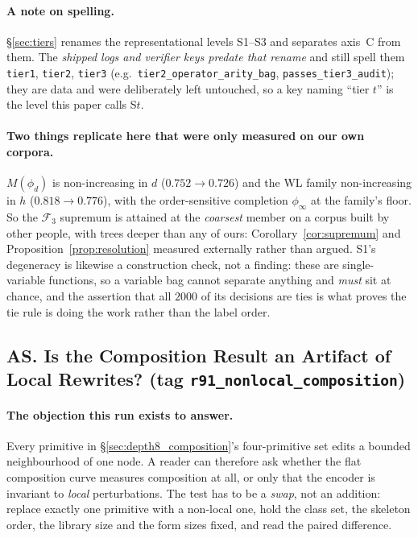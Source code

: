 \paragraph{A note on spelling.} \S\ref{sec:tiers} renames the representational levels S1--S3 and separates axis~C from them. The \emph{shipped logs and verifier keys predate that rename} and still spell them \texttt{tier1}, \texttt{tier2}, \texttt{tier3} (e.g.\ \texttt{tier2\_operator\_arity\_bag}, \texttt{passes\_tier3\_audit}); they are data and were deliberately left untouched, so a key naming ``tier $t$'' is the level this paper calls S$t$.

\paragraph{Two things replicate here that were only measured on our own corpora.} $M(\phi_d)$ is non-increasing in $d$ ($0.752 \to 0.726$) and the WL family non-increasing in $h$ ($0.818 \to 0.776$), with the order-sensitive completion $\phi_\infty$ at the family's floor. So the $\mathcal{F}_3$ supremum is attained at the \emph{coarsest} member on a corpus built by other people, with trees deeper than any of ours: Corollary~\ref{cor:supremum} and Proposition~\ref{prop:resolution} measured externally rather than argued. S1's degeneracy is likewise a construction check, not a finding: these are single-variable functions, so a variable bag cannot separate anything and \emph{must} sit at chance, and the assertion that all $2000$ of its decisions are ties is what proves the tie rule is doing the work rather than the label order.


\subsection*{AS. Is the Composition Result an Artifact of Local Rewrites? (tag \texttt{r91\_nonlocal\_composition})}

\paragraph{The objection this run exists to answer.} Every primitive in \S\ref{sec:depth8_composition}'s four-primitive set edits a bounded neighbourhood of one node. A reader can therefore ask whether the flat composition curve measures composition at all, or only that the encoder is invariant to \emph{local} perturbations. The test has to be a \emph{swap}, not an addition: replace exactly one primitive with a non-local one, hold the class set, the skeleton order, the library size and the form sizes fixed, and read the paired difference.

